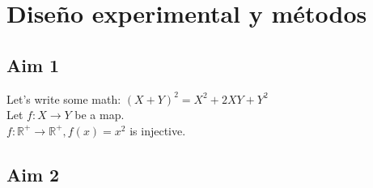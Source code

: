 \section{Diseño experimental y métodos}\label{sec:experimental} 

\lipsum*[2-3] 

\subsection{Aim 1}\label{sec:aim1}

Let's write some math: $(X+Y)^2=X^2+2XY+Y^2$\\

\noindent Let $f\colon X\to Y$ be a map.\\

\noindent $f\colon \mathbb{R^+}\to\mathbb{R^+}, f(x) = x^2$ is injective.\\


\subsection{Aim 2}\label{sec:aim2}

